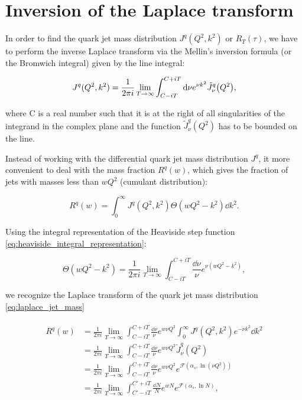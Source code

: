\documentclass[../Tesi_Jiahao_Miao_986136.tex]{subfiles}
\begin{document}
\section{Inversion of the Laplace transform}

In order to find the quark jet mass distribution $J^q(Q^2,k^2)$ or $R_T(\tau)$, we have to perform the inverse Laplace transform via 
the Mellin's inversion formula (or the Bromwich integral) given by the line integral: 

\begin{equation} \label{eq:inverse_laplace}
    J^q(Q^2,k^2) = \frac{1}{2\pi i} \lim_{T \to \infty}\int_{C-iT}^{C+iT} \dd \nu e^{\nu k^2} \tilde{J}^q_\nu \qty(Q^2),
\end{equation}

where C is a real number such that it is at the right of all singularities of the integrand in the complex plane and
the function $\tilde{J}^q_\nu(Q^2)$ has to be bounded on the line.

Instead of working with the differential quark jet mass distribution $J^q$, it more convenient to deal with
the mass fraction $R^q(w)$, which gives the fraction of jets with masses less than $wQ^2$ (cumulant distribution):

\begin{equation}\label{eq:jet mass fraction}
    R^q(w) = \int_0^\infty J^q(Q^2,k^2)\Theta(wQ^2-k^2) \dd k^2.
\end{equation}

Using the integral representation of the Heaviside step function \cref{eq:heaviside_integral_representation}:

\begin{equation}
    \Theta(wQ^2-k^2) = \frac{1}{2\pi i} \lim_{T \to \infty}\int_{C-iT}^{C+iT} \frac{\dd \nu}{\nu} e^{\nu (wQ^2-k^2)},
\end{equation}

we recognize the Laplace transform of the quark jet mass distribution \cref{eq:laplace_jet_mass}

\begin{align}
    \begin{split}\label{eq:Rw mass fraction}
        R^q(w) &= \frac{1}{2\pi i} \lim_{T \to \infty} \int_{C-iT}^{C+iT} \frac{\dd \nu}{\nu} e^{w \nu Q^2} \int_0^\infty J^q(Q^2,k^2) e^{-\nu k^2} \dd k^2 \\
        &= \frac{1}{2\pi i} \lim_{T \to \infty} \int_{C-iT}^{C+iT} \frac{\dd \nu}{\nu} e^{w \nu Q^2} \tilde{J}^q_\nu(Q^2) \\
        &= \frac{1}{2\pi i} \lim_{T \to \infty} \int_{C-iT}^{C+iT} \frac{\dd \nu}{\nu} e^{w \nu Q^2} e^{\mathcal{F}(\alpha_s,\ln(\nu Q^2))}\\
        &= \frac{1}{2\pi i} \lim_{T \to \infty} \int_{C'-iT}^{C'+iT} \frac{\dd N}{N} e^{w N} e^{\mathcal{F}(\alpha_s,\ln N)},
    \end{split}
\end{align}
\end{document}
